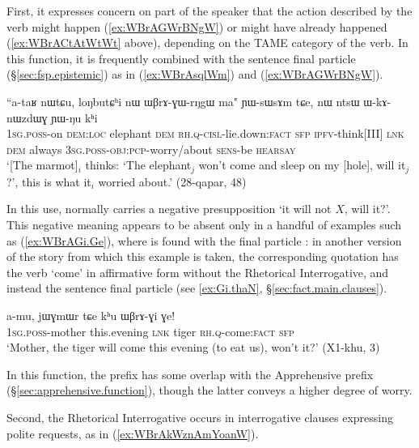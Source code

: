 First, it expresses concern on part of the speaker that the action described by the verb might happen (\ref{ex:WBrAGWrBNgW}) or might have already happened (\ref{ex:WBrACtAtWtWt} above), depending on the TAME category of the verb. In this function, it is frequently combined with the sentence final particle  (§\ref{sec:fsp.epistemic}) as in (\ref{ex:WBrAsqlWm}) and (\ref{ex:WBrAGWrBNgW}).
 
 \begin{exe}
\ex \label{ex:WBrAGWrBNgW}
\gll  ``a-taʁ nɯtɕu,  loŋbutɕʰi nɯ ɯβrɤ-ɣɯ-rŋgɯ ma" ɲɯ-sɯsɤm tɕe, nɯ ntsɯ ɯ-kɤ-nɯzdɯɣ ɲɯ-ŋu kʰi \\ 
\textsc{1sg}.\textsc{poss}-on \textsc{dem}:\textsc{loc} elephant \textsc{dem} \textsc{rh}.\textsc{q}-\textsc{cisl}-lie.down:\textsc{fact} \textsc{sfp} \textsc{ipfv}-think[III] \textsc{lnk} \textsc{dem} always \textsc{3sg}.\textsc{poss}-\textsc{obj}:\textsc{pcp}-worry/about \textsc{sens}-be \textsc{hearsay} \\
\glt `[The marmot]$_i$ thinks: `The elephant$_j$ won't come and sleep on my [hole], will it$_j$?', this is what it$_i$ worried about.' (28-qapar, 48)
\end{exe}

In this use,  normally carries a negative presupposition `it will not $X$, will it?'. This negative meaning appears to be absent only  in a handful of examples such as (\ref{ex:WBrAGi.Ge}), where  is found with the final particle : in another version of the story from which this example is taken, the corresponding quotation has the verb  `come' in affirmative form without the Rhetorical Interrogative, and instead the sentence final particle  (see \ref{ex:Gi.thaN}, §\ref{sec:fact.main.clauses}).

\begin{exe}
\ex \label{ex:WBrAGi.Ge}
\gll  a-mu, jɯɣmɯr tɕe kʰu ɯβrɤ-ɣi ɣe! \\
\textsc{1sg}.\textsc{poss}-mother this.evening \textsc{lnk} tiger \textsc{rh}.\textsc{q}-come:\textsc{fact} \textsc{sfp} \\
\glt `Mother, the tiger will come this evening (to eat us), won't it?' (X1-khu, 3)
\end{exe}
 
In this function, the prefix  has some overlap with the Apprehensive prefix  (§\ref{sec:apprehensive.function}), though the latter conveys a higher degree of worry.

Second, the Rhetorical Interrogative occurs in interrogative clauses expressing polite requests, as in (\ref{ex:WBrAkWznAmYoanW}).   

